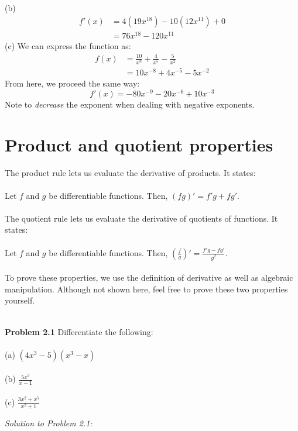\documentclass[11pt]{scrartcl}
\begin{document}
\noindent
(b) \begin{align*}
    f'(x) &= 4(19x^{18})-10(12x^{11})+0\\
          &= 76x^{18}-120x^{11}
          \end{align*}
          \noindent
(c) We can express the function as:
\begin{align*}
    f(x) & = \frac{10}{x^8}+\frac{4}{x^5}-\frac{5}{x^2}\\
         & = 10x^{-8}+4x^{-5}-5x^{-2}
\end{align*}
From here, we proceed the same way:
$$f'(x)=-80x^{-9}-20x^{-6}+10x^{-3}$$
Note to \textit{decrease} the exponent when dealing with negative exponents.
\section{Product and quotient properties}
The product rule lets us evaluate the derivative of products. It states:\\
\noindent\\
Let $f$ and $g$ be differentiable functions. Then, $(fg)'=f'g+fg'$.
\\
\noindent\\
The quotient rule lets us evaluate the derivative of quotients of functions. It states:\\
\noindent\\
Let $f$ and $g$ be differentiable functions. Then,  $\left(\frac{f}{g}\right)'=\frac{f'g-fg'}{g^2}$.\\
\noindent\\
To prove these properties, we use the definition of derivative as well as algebraic manipulation. Although not shown here, feel free to prove these two properties yourself. \\
\noindent\\
\begin{tcolorbox}
[colback=purple!5!white,colframe=purple!75!black]
\textbf{Problem 2.1} Differentiate the following:\\
\noindent\\
(a) \;\;\;\;$(4x^3-5)(x^3-x)$\\
\noindent\\
(b) \;\;\;\;$\frac{5x^3}{x-1}$\\
\noindent\\
(c) \;\;\;\;$\frac{3x^2+x^5}{x^2+1}$
\end{tcolorbox}
\noindent
\textit{Solution to Problem 2.1:}\\
\noindent\\
\end{document}
